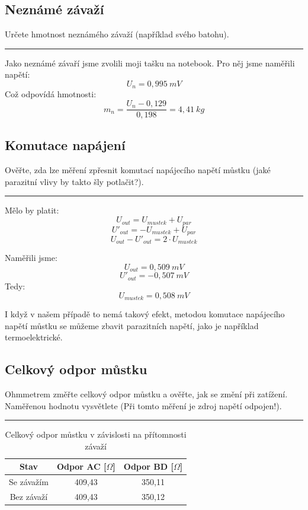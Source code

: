 \documentclass[a4paper,12pt]{article}
\begin{document}
\subsection{Neznámé závaží}
Určete hmotnost neznámého závaží (například svého batohu).
\par\noindent\rule{\textwidth}{0.4pt}

Jako neznámé závaří jsme zvolili moji tašku na notebook. Pro něj jsme naměřili napětí:
$$
U_n = 0,995\ mV
$$
Což odpovídá hmotnosti:
$$
m_n = \frac{U_n - 0,129}{0,198} = 4,41\ kg
$$

\subsection{Komutace napájení}
Ověřte, zda lze měření zpřesnit komutací napájecího napětí můstku (jaké parazitní vlivy by takto šly potlačit?).
\par\noindent\rule{\textwidth}{0.4pt}

Mělo by platit:
$$
U_{out} = U_{mustek} + U_{par}
$$
$$
U'_{out} = -U_{mustek} + U_{par}
$$
$$
U_{out}-U'_{out} = 2\cdot U_{mustek}
$$

Naměřili jsme:
$$
U_{out} = 0,509\ mV
$$
$$
U'_{out} = -0,507\ mV
$$
Tedy:
$$
U_{mustek} = 0,508\ mV
$$

I když v našem případě to nemá takový efekt, metodou komutace napájecího napětí můstku se můžeme zbavit parazitních napětí, jako je například termoelektrické.

\subsection{Celkový odpor můstku}
Ohmmetrem změřte celkový odpor můstku a ověřte, jak se změní při zatížení. Naměřenou hodnotu vysvětlete (Při tomto měření je zdroj napětí odpojen!).
\par\noindent\rule{\textwidth}{0.4pt}

\begin{table}[H]
\centering
\begin{tabular}{|c|c|c|}
\hline
\textbf{Stav} & \textbf{Odpor AC [$\Omega$]} & \textbf{Odpor BD [$\Omega$]} \\ \hline
Se závažím & 409{,}43 & 350{,}11 \\ \hline
Bez závaží & 409{,}43 & 350{,}12 \\ \hline
\end{tabular}
\caption{Celkový odpor můstku v závislosti na přítomnosti závaží}
\end{table}
\end{document}
